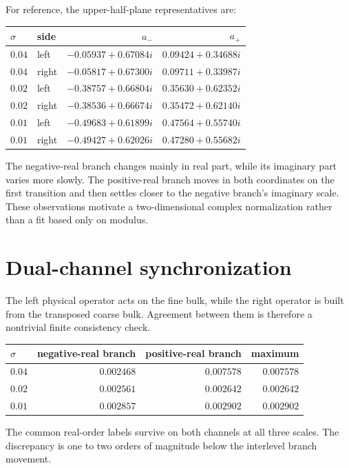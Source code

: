 \documentclass[12pt]{article}
\theoremstyle{remark}\newtheorem{remark}[theorem]{Remark}
\begin{document}
For reference, the upper-half-plane representatives are:
\begin{center}
\small
\begin{tabular}{llrr}
\toprule
$\sigma$ & side & $a_-$ & $a_+$\\
\midrule
$0.04$ & left  & $-0.05937+0.67084i$ & $0.09424+0.34688i$\\
$0.04$ & right & $-0.05817+0.67300i$ & $0.09711+0.33987i$\\
$0.02$ & left  & $-0.38757+0.66804i$ & $0.35630+0.62352i$\\
$0.02$ & right & $-0.38536+0.66674i$ & $0.35472+0.62140i$\\
$0.01$ & left  & $-0.49683+0.61899i$ & $0.47564+0.55740i$\\
$0.01$ & right & $-0.49427+0.62026i$ & $0.47280+0.55682i$\\
\bottomrule
\end{tabular}
\end{center}
The negative-real branch changes mainly in real part, while its imaginary
part varies more slowly.  The positive-real branch moves in both coordinates
on the first transition and then settles closer to the negative branch's
imaginary scale.  These observations motivate a two-dimensional complex
normalization rather than a fit based only on modulus.

\section{Dual-channel synchronization}

The left physical operator acts on the fine bulk, while the right operator
is built from the transposed coarse bulk.  Agreement between them is
therefore a nontrivial finite consistency check.

\begin{center}
\begin{tabular}{lrrr}
\toprule
$\sigma$ & negative-real branch & positive-real branch & maximum\\
\midrule
$0.04$ & $0.002468$ & $0.007578$ & $0.007578$\\
$0.02$ & $0.002561$ & $0.002642$ & $0.002642$\\
$0.01$ & $0.002857$ & $0.002902$ & $0.002902$\\
\bottomrule
\end{tabular}
\end{center}
The common real-order labels survive on both channels at all three scales.
The discrepancy is one to two orders of magnitude below the interlevel
branch movement.
\end{document}
